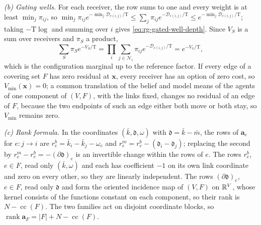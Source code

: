 \emph{(b) Gating wells.} For each receiver, the row sums to one and every
weight is at least \(\min_j\pi_{ij}\), so
\(\min_j\pi_{ij}e^{-\min_j\mathcal D_{e(i,j)}/\mathrm T}
\le\sum_j\pi_{ij}e^{-\mathcal D_{e(i,j)}/\mathrm T}
\le e^{-\min_j\mathcal D_{e(i,j)}/\mathrm T}\); taking \(-\mathrm T\log\) and
summing over \(i\) gives \cref{eq:rg-gated-well-depth}. Since \(V_S\) is a sum
over receivers and \(\pi_S\) a product,
\[
\sum_S\pi_Se^{-V_S/\mathrm T}=\prod_i\sum_{j\in\mathcal N_i}\pi_{ij}
e^{-\mathcal D_{e(i,j)}/\mathrm T}=e^{-V_\pi/\mathrm T},
\]
which is the configuration marginal up to the reference factor. If every edge of a
covering set \(F\) has zero residual at \(\mathbf x\), every receiver has an
option of zero cost, so \(V_{\min}(\mathbf x)=0\); a common translation of the
belief and model means of the agents of one component of \((V,F)\), with the
links fixed, changes no residual of an edge of \(F\), because the two
endpoints of such an edge either both move or both stay, so \(V_{\min}\)
remains zero.

\emph{(c) Rank formula.} In the coordinates \((\bar k,\mathfrak d,\omega)\)
with \(\mathfrak d=\bar k-\bar m\), the rows of \(\mathbf a_e\) for
\(e:j\to i\) are \(r^b_e=\bar k_i-\bar k_j-\omega_e\) and
\(r^m_e=r^b_e-(\mathfrak d_i-\mathfrak d_j)\); replacing the second by
\(r^m_e-r^b_e=-(\partial\mathfrak d)_e\) is an invertible change within the
rows of \(e\). The rows \(r^b_e\), \(e\in F\), read only \((\bar k,\omega)\)
and each has coefficient \(-1\) on its own link coordinate and zero on every
other, so they are linearly independent. The rows \((\partial\mathfrak d)_e\),
\(e\in F\), read only \(\mathfrak d\) and form the oriented incidence map of
\((V,F)\) on \(\mathbb R^V\), whose kernel consists of the functions constant on each
component, so their rank is \(N-\operatorname{cc}(F)\). The two families act
on disjoint coordinate blocks, so
\(\operatorname{rank}\mathbf a_F=|F|+N-\operatorname{cc}(F)\).

